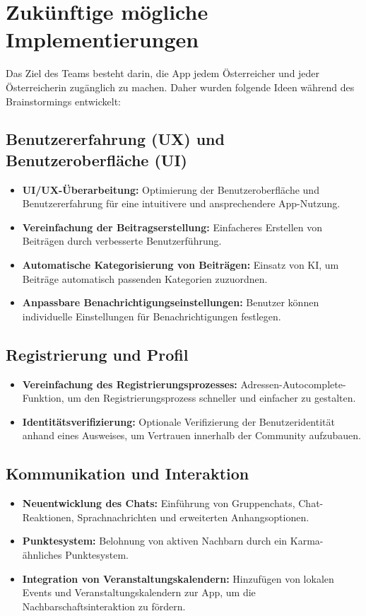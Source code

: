 \section{Zukünftige mögliche Implementierungen}

Das Ziel des Teams besteht darin, die App jedem Österreicher und jeder Österreicherin zugänglich zu machen. Daher wurden folgende Ideen während des Brainstormings entwickelt:

\subsection{Benutzererfahrung (UX) und Benutzeroberfläche (UI)}
\begin{itemize}
    \item \textbf{UI/UX-Überarbeitung:} Optimierung der Benutzeroberfläche und Benutzererfahrung für eine intuitivere und ansprechendere App-Nutzung.
    \item \textbf{Vereinfachung der Beitragserstellung:} Einfacheres Erstellen von Beiträgen durch verbesserte Benutzerführung.
    \item \textbf{Automatische Kategorisierung von Beiträgen:} Einsatz von KI, um Beiträge automatisch passenden Kategorien zuzuordnen.
    \item \textbf{Anpassbare Benachrichtigungseinstellungen:} Benutzer können individuelle Einstellungen für Benachrichtigungen festlegen.
\end{itemize}

\subsection{Registrierung und Profil}
\begin{itemize}
    \item \textbf{Vereinfachung des Registrierungsprozesses:} Adressen-Autocomplete-Funktion, um den Registrierungsprozess schneller und einfacher zu gestalten.
    \item \textbf{Identitätsverifizierung:} Optionale Verifizierung der Benutzeridentität anhand eines Ausweises, um Vertrauen innerhalb der Community aufzubauen.
\end{itemize}

\subsection{Kommunikation und Interaktion}
\begin{itemize}
    \item \textbf{Neuentwicklung des Chats:} Einführung von Gruppenchats, Chat-Reaktionen, Sprachnachrichten und erweiterten Anhangsoptionen.
    \item \textbf{Punktesystem:} Belohnung von aktiven Nachbarn durch ein Karma-ähnliches Punktesystem.
    \item \textbf{Integration von Veranstaltungskalendern:} Hinzufügen von lokalen Events und Veranstaltungskalendern zur App, um die Nachbarschaftsinteraktion zu fördern.
    
\end{itemize}

